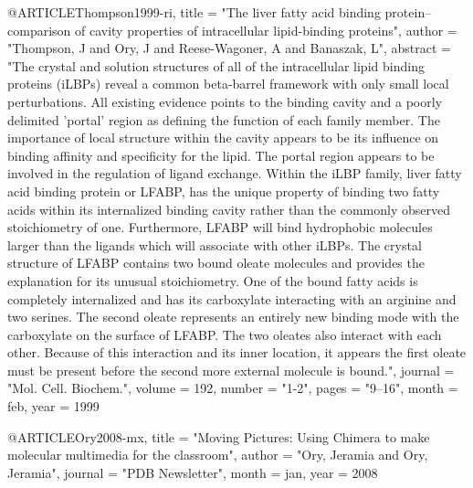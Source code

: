 @ARTICLE{Thompson1999-ri,
  title    = "The liver fatty acid binding protein--comparison of cavity
              properties of intracellular lipid-binding proteins",
  author   = "Thompson, J and Ory, J and Reese-Wagoner, A and Banaszak, L",
  abstract = "The crystal and solution structures of all of the intracellular
              lipid binding proteins (iLBPs) reveal a common beta-barrel
              framework with only small local perturbations. All existing
              evidence points to the binding cavity and a poorly delimited
              'portal' region as defining the function of each family member.
              The importance of local structure within the cavity appears to be
              its influence on binding affinity and specificity for the lipid.
              The portal region appears to be involved in the regulation of
              ligand exchange. Within the iLBP family, liver fatty acid binding
              protein or LFABP, has the unique property of binding two fatty
              acids within its internalized binding cavity rather than the
              commonly observed stoichiometry of one. Furthermore, LFABP will
              bind hydrophobic molecules larger than the ligands which will
              associate with other iLBPs. The crystal structure of LFABP
              contains two bound oleate molecules and provides the explanation
              for its unusual stoichiometry. One of the bound fatty acids is
              completely internalized and has its carboxylate interacting with
              an arginine and two serines. The second oleate represents an
              entirely new binding mode with the carboxylate on the surface of
              LFABP. The two oleates also interact with each other. Because of
              this interaction and its inner location, it appears the first
              oleate must be present before the second more external molecule
              is bound.",
  journal  = "Mol. Cell. Biochem.",
  volume   =  192,
  number   = "1-2",
  pages    = "9--16",
  month    =  feb,
  year     =  1999
}

@ARTICLE{Ory2008-mx,
  title   = "Moving Pictures: Using Chimera to make molecular multimedia for
             the classroom",
  author  = "Ory, Jeramia and Ory, Jeramia",
  journal = "PDB Newsletter",
  month   =  jan,
  year    =  2008
}

